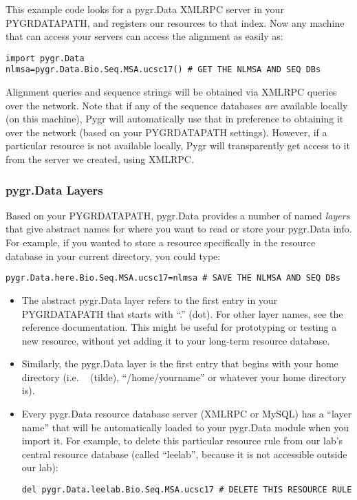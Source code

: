 \documentclass{howto}
\begin{document}
This example code looks for a pygr.Data XMLRPC server in your PYGRDATAPATH,
and registers our resources to that index.  Now any machine that can access
your servers can access the alignment as easily as:
\begin{verbatim}
import pygr.Data
nlmsa=pygr.Data.Bio.Seq.MSA.ucsc17() # GET THE NLMSA AND SEQ DBs
\end{verbatim}
Alignment queries and sequence strings will be obtained via XMLRPC 
queries over the network.  Note that if any of the sequence databases
{\em are} available locally (on this machine), Pygr will automatically use that 
in preference to obtaining it over the network (based on your PYGRDATAPATH
settings).  However, if a particular resource is not available locally,
Pygr will transparently get access to it from the server we created,
using XMLRPC.

\subsubsection{pygr.Data Layers}
Based on your PYGRDATAPATH, pygr.Data provides a number of named {\em layers}
that give abstract names for where you want to read or store your pygr.Data info.
For example, if you wanted to store a resource specifically in the resource
database in your current directory, you could type:
\begin{verbatim}
pygr.Data.here.Bio.Seq.MSA.ucsc17=nlmsa # SAVE THE NLMSA AND SEQ DBs
\end{verbatim}
\begin{itemize}
\item The abstract pygr.Data layer  refers to the first entry in your
PYGRDATAPATH that starts with ``.'' (dot).  For other layer names, see
the reference documentation.  This might be useful for prototyping or
testing a new resource, without yet adding it to your long-term resource
database.

\item Similarly, the pygr.Data layer
 is the first entry that begins with your home directory
(i.e. ~ (tilde), ``/home/yourname'' or whatever your home directory is).

\item Every pygr.Data resource database server (XMLRPC or MySQL) has
a ``layer name'' that will be automatically loaded to your pygr.Data module
when you import it.  For example, to delete this particular resource rule
from our lab's central resource database (called ``leelab'', because it is
not accessible outside our lab):
\begin{verbatim}
del pygr.Data.leelab.Bio.Seq.MSA.ucsc17 # DELETE THIS RESOURCE RULE
\end{verbatim}
\end{itemize}
\end{document}
